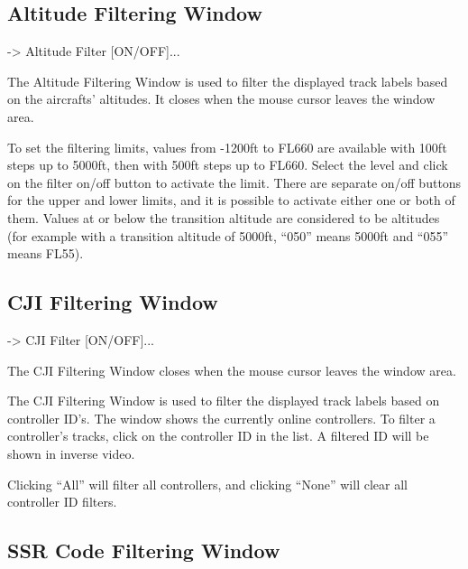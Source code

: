 \documentclass[a4paper,oneside,11pt]{memoir}
\begin{document}
\subsection{Altitude Filtering Window}
\label{win:afw}

 -> Altitude Filter [ON/OFF]...

\bigskip

The Altitude Filtering Window is used to filter the displayed track labels based on the aircrafts’ altitudes. It closes when the mouse cursor leaves the window area.


To set the filtering limits, values from -1200ft to FL660 are available with 100ft steps up to 5000ft, then with 500ft steps up to FL660. Select the level and click on the filter on/off button to activate the limit. There are separate on/off buttons for the upper and lower limits, and it is possible to activate either one or both of them. Values at or below the transition altitude are considered to be altitudes (for example with a transition altitude of 5000ft, “050” means 5000ft and “055” means FL55).

\subsection{CJI Filtering Window}
\label{win:cji}

 -> CJI Filter [ON/OFF]...

\bigskip


The CJI Filtering Window closes when the mouse cursor leaves the window area.

\bigskip

The CJI Filtering Window is used to filter the displayed track labels based on controller ID’s. The window shows the currently online controllers. To filter a controller’s tracks, click on the controller ID in the list. A filtered ID will be shown in inverse video.

\bigskip

Clicking “All” will filter all controllers, and clicking “None” will clear all controller ID filters.

\subsection{SSR Code Filtering Window}
\label{win:ssr}
\end{document}
